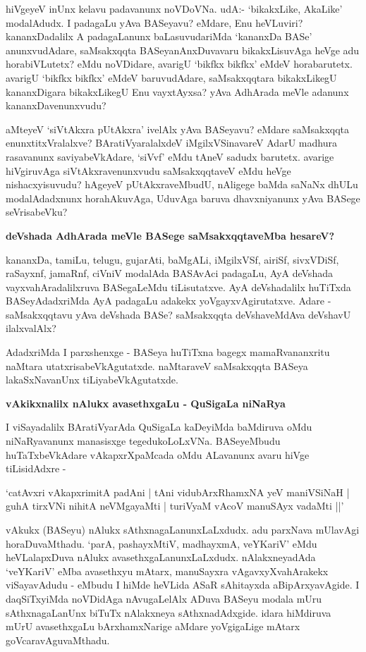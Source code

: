 hiVgeyeV inUnx kelavu padavanunx noVDoVNa. udA:- `bikakxLike, AkaLike' modalAdudx. I padagaLu yAva BASeyavu? eMdare, Enu heVLuviri? kananxDadalilx A padagaLanunx baLasuvudariMda `kananxDa BASe' anunxvudAdare, saMsakxqqta BASeyanAnxDuvavaru bikakxLisuvAga heVge adu horabiVLutetx? eMdu noVDidare, avarigU `bikfkx bikfkx' eMdeV horabarutetx. avarigU `bikfkx bikfkx' eMdeV baruvudAdare, saMsakxqqtara bikakxLikegU kananxDigara bikakxLikegU Enu vayxtAyxsa? yAva AdhArada meVle adanunx kananxDavenunxvudu?

aMteyeV `siVtAkxra pUtAkxra' ivelAlx yAva BASeyavu? eMdare saMsakxqqta enunxtitxVralalxve? BAratiVyaralalxdeV iMgilxVSinavareV AdarU madhura rasavanunx saviyabeVkAdare, `siVvf' eMdu tAneV sadudx barutetx. avarige hiVgiruvAga siVtAkxravenunxvudu saMsakxqqtaveV eMdu heVge nishacxyisuvudu? hAgeyeV pUtAkxraveMbudU, nAligege baMda saNaNx dhULu modalAdadxnunx horahAkuvAga, UduvAga baruva dhavxniyanunx yAva BASege seVrisabeVku?

\noindent
\textbf{deVshada AdhArada meVle BASege saMsakxqqtaveMba hesareV?}\label{page7}

kananxDa, tamiLu, telugu, gujarAti, baMgALi, iMgilxVSf, airiSf, sivxVDiSf, raSayxnf, jamaRnf, ciVniV modalAda BASAvAci padagaLu, AyA deVshada vayxvahAradalilxruva BASegaLeMdu tiLisutatxve. AyA deVshadalilx huTiTxda BASeyAdadxriMda AyA padagaLu adakekx yoVgayxvAgirutatxve. Adare - saMsakxqqtavu yAva deVshada BASe? saMsakxqqta deVshaveMdAva deVshavU ilalxvalAlx?

AdadxriMda I parxshenxge - BASeya huTiTxna bagegx mamaRvananxritu naMtara utatxrisabeVkAgutatxde. naMtaraveV saMsakxqqta BASeya lakaSxNavanUnx tiLiyabeVkAgutatxde.

\noindent
\textbf{vAkikxnalilx nAlukx avasethxgaLu - QuSigaLa niNaRya}\label{page8}

I viSayadalilx BAratiVyarAda QuSigaLa kaDeyiMda baMdiruva oMdu niNaRyavanunx manasisxge tegedukoLoLxVNa. BASeyeMbudu huTaTxbeVkAdare vAkapxrXpaMcada oMdu ALavanunx avaru hiVge tiLisidAdxre -

\begin{shloka}
`catAvxri vAkapxrimitA padAni | tAni vidubArxRhamxNA yeV maniVSiNaH |\\\label{1}
guhA tirxVNi nihitA neVMgayaMti | turiVyaM vAcoV manuSAyx vadaMti ||'
\end{shloka}

vAkukx (BASeyu) nAlukx sAthxnagaLanunxLaLxdudx. adu parxNava mUlavAgi horaDuvaMthadu. `parA, pashayxMtiV, madhayxmA, veYKariV' eMdu heVLalapxDuva nAlukx avasethxgaLanunxLaLxdudx. nAlakxneyadAda `veYKariV' eMba avasethxyu mAtarx, manuSayxra vAgavxyXvahArakekx viSayavAdudu - eMbudu I hiMde heVLida ASaR sAhitayxda aBipArxyavAgide. I daqSiTxyiMda noVDidAga nAvugaLelAlx ADuva BASeyu modala mUru sAthxnagaLanUnx biTuTx nAlakxneya sAthxnadAdxgide. idara hiMdiruva mUrU avasethxgaLu bArxhamxNarige aMdare yoVgigaLige mAtarx goVcaravAguvaMthadu.

